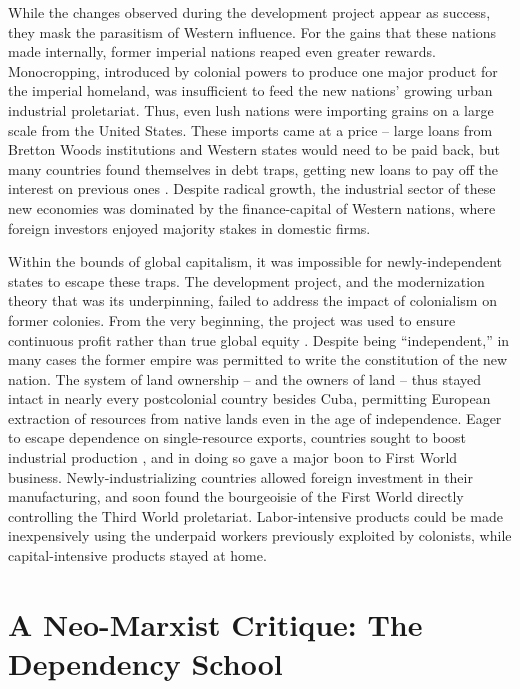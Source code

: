 \documentclass[american]{../../../coursework}
\begin{document}
While the changes observed during the development project appear as success,
they mask the parasitism of Western influence. For the gains that these
nations made internally, former imperial nations reaped even greater rewards.
Monocropping, introduced by colonial powers to produce one major product for
the imperial homeland, was insufficient to feed the new nations' growing urban
industrial proletariat. Thus, even lush nations were importing grains on a
large scale from the United States. These imports came at a price -- large
loans from Bretton Woods institutions and Western states would need to be paid
back, but many countries found themselves in debt traps, getting new loans to
pay off the interest on previous ones \parencite{McMichael2004}. Despite
radical growth, the industrial sector of these new economies was dominated by
the finance-capital of Western nations, where foreign investors enjoyed
majority stakes in domestic firms.

Within the bounds of global capitalism, it was impossible for
newly-independent states to escape these traps. The development project, and
the modernization theory that was its underpinning, failed to address the
impact of colonialism on former colonies. From the very beginning, the project
was used to ensure continuous profit rather than true global equity
\parencite{Frank1966}. Despite being ``independent,'' in many cases the former
empire was permitted to write the constitution of the new nation. The system
of land ownership -- and the owners of land -- thus stayed intact in nearly
every postcolonial country besides Cuba, permitting European extraction of
resources from native lands even in the age of independence. Eager to escape
dependence on single-resource exports, countries sought to boost industrial
production \parencite{McMichael2004}, and in doing so gave a major boon to
First World business. Newly-industrializing countries allowed foreign
investment in their manufacturing, and soon found the bourgeoisie of the First
World directly controlling the Third World proletariat. Labor-intensive
products could be made inexpensively using the underpaid workers previously
exploited by colonists, while capital-intensive products stayed at home.

\section{A Neo-Marxist Critique: The Dependency School}
\end{document}
